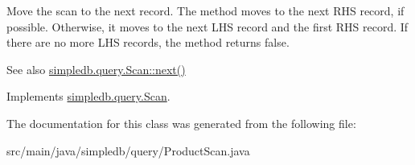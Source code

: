 Move the scan to the next record. The method moves to the next R\+HS record, if possible. Otherwise, it moves to the next L\+HS record and the first R\+HS record. If there are no more L\+HS records, the method returns false. \begin{DoxySeeAlso}{See also}
\hyperlink{interfacesimpledb_1_1query_1_1Scan_a5fc77b7c76d91f89f6c09ac4f15ef351}{simpledb.\+query.\+Scan\+::next()} 
\end{DoxySeeAlso}


Implements \hyperlink{interfacesimpledb_1_1query_1_1Scan_a5fc77b7c76d91f89f6c09ac4f15ef351}{simpledb.\+query.\+Scan}.



The documentation for this class was generated from the following file\+:\begin{DoxyCompactItemize}
\item 
src/main/java/simpledb/query/Product\+Scan.\+java\end{DoxyCompactItemize}
